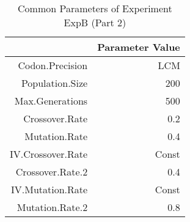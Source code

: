 \begin{table}[ht]
\centering
\begin{tabular}{rr}
  \hline
 & Parameter Value \\ 
  \hline
Codon.Precision & LCM \\ 
  Population.Size & 200 \\ 
  Max.Generations & 500 \\ 
  Crossover.Rate & 0.2 \\ 
  Mutation.Rate & 0.4 \\ 
  IV.Crossover.Rate & Const \\ 
  Crossover.Rate.2 & 0.4 \\ 
  IV.Mutation.Rate & Const \\ 
  Mutation.Rate.2 & 0.8 \\ 
   \hline
\end{tabular}
\caption{Common Parameters of Experiment ExpB (Part 2)} 
\end{table}
